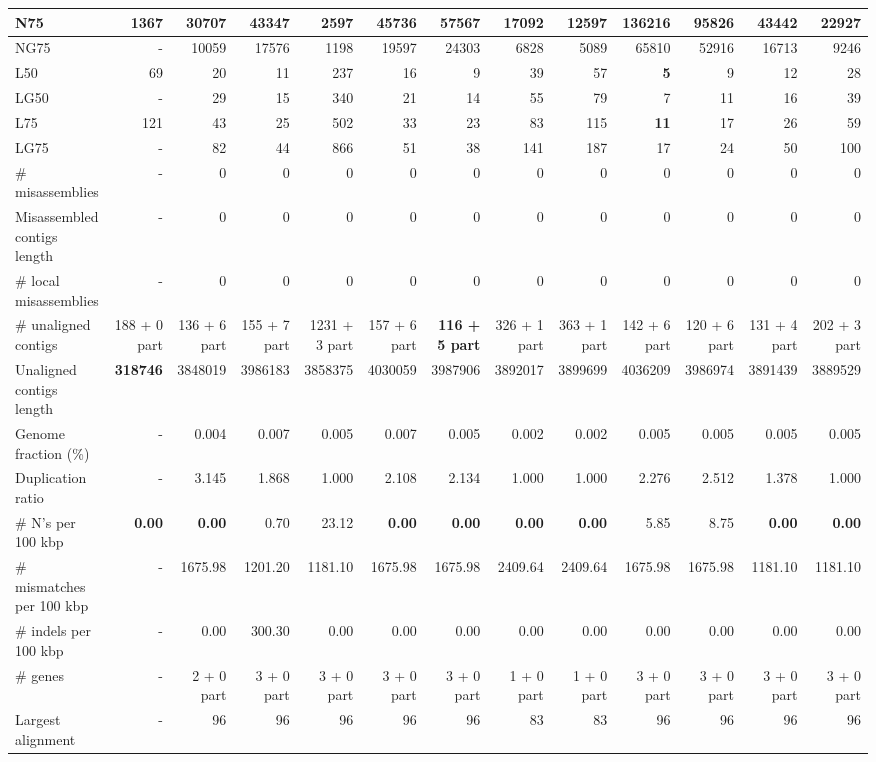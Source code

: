 \documentclass[12pt,a4paper]{article}
\begin{document}
\begin{table}[ht]
\begin{center}
\begin{tabular}{|l*{12}{|r}|}
N75 & 1367 & 30707 & 43347 & 2597 & 45736 & 57567 & 17092 & 12597 & {\bf 136216} & 95826 & 43442 & 22927 \\ \hline
NG75 & - & 10059 & 17576 & 1198 & 19597 & 24303 & 6828 & 5089 & 65810 & 52916 & 16713 & 9246 \\ \hline
L50 & 69 & 20 & 11 & 237 & 16 & 9 & 39 & 57 & {\bf 5} & 9 & 12 & 28 \\ \hline
LG50 & - & 29 & 15 & 340 & 21 & 14 & 55 & 79 & 7 & 11 & 16 & 39 \\ \hline
L75 & 121 & 43 & 25 & 502 & 33 & 23 & 83 & 115 & {\bf 11} & 17 & 26 & 59 \\ \hline
LG75 & - & 82 & 44 & 866 & 51 & 38 & 141 & 187 & 17 & 24 & 50 & 100 \\ \hline
\# misassemblies & - & 0 & 0 & 0 & 0 & 0 & 0 & 0 & 0 & 0 & 0 & 0 \\ \hline
Misassembled contigs length & - & 0 & 0 & 0 & 0 & 0 & 0 & 0 & 0 & 0 & 0 & 0 \\ \hline
\# local misassemblies & - & 0 & 0 & 0 & 0 & 0 & 0 & 0 & 0 & 0 & 0 & 0 \\ \hline
\# unaligned contigs & 188 + 0 part & 136 + 6 part & 155 + 7 part & 1231 + 3 part & 157 + 6 part & {\bf 116 + 5 part} & 326 + 1 part & 363 + 1 part & 142 + 6 part & 120 + 6 part & 131 + 4 part & 202 + 3 part \\ \hline
Unaligned contigs length & {\bf 318746} & 3848019 & 3986183 & 3858375 & 4030059 & 3987906 & 3892017 & 3899699 & 4036209 & 3986974 & 3891439 & 3889529 \\ \hline
Genome fraction (\%) & - & 0.004 & 0.007 & 0.005 & 0.007 & 0.005 & 0.002 & 0.002 & 0.005 & 0.005 & 0.005 & 0.005 \\ \hline
Duplication ratio & - & 3.145 & 1.868 & 1.000 & 2.108 & 2.134 & 1.000 & 1.000 & 2.276 & 2.512 & 1.378 & 1.000 \\ \hline
\# N's per 100 kbp & {\bf 0.00} & {\bf 0.00} & 0.70 & 23.12 & {\bf 0.00} & {\bf 0.00} & {\bf 0.00} & {\bf 0.00} & 5.85 & 8.75 & {\bf 0.00} & {\bf 0.00} \\ \hline
\# mismatches per 100 kbp & - & 1675.98 & 1201.20 & 1181.10 & 1675.98 & 1675.98 & 2409.64 & 2409.64 & 1675.98 & 1675.98 & 1181.10 & 1181.10 \\ \hline
\# indels per 100 kbp & - & 0.00 & 300.30 & 0.00 & 0.00 & 0.00 & 0.00 & 0.00 & 0.00 & 0.00 & 0.00 & 0.00 \\ \hline
\# genes & - & 2 + 0 part & 3 + 0 part & 3 + 0 part & 3 + 0 part & 3 + 0 part & 1 + 0 part & 1 + 0 part & 3 + 0 part & 3 + 0 part & 3 + 0 part & 3 + 0 part \\ \hline
Largest alignment & - & 96 & 96 & 96 & 96 & 96 & 83 & 83 & 96 & 96 & 96 & 96 \\ \hline
\end{tabular}
\end{center}
\end{table}
\end{document}
